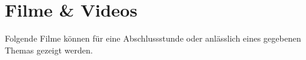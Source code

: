 \geometry{
	a4paper,
	left=25mm,
	right=25mm,
	top=25mm,
	bottom=25mm,
}

\pagestyle{fancy}
\fancyhf{}
\fancyhead[L]{\leftmark}
\fancyhead[R]{\thepage}
\fancyfoot[C]{\today}

\newcommand{\ratingcolor}[1]{%
   \ifcase#1
    \textcolor{gray}{\faTachometer* #1/ 5}%
  \or
    \textcolor{red!80!black}{\faTachometer* #1/ 5}%
  \or
    \textcolor{orange!80!black}{\faTachometer* #1/ 5}%
  \or
    \textcolor{yellow!80!black}{\faTachometer* #1/ 5}%
  \or
    \textcolor{green!60!black}{\faTachometer* #1/ 5}%
  \or
    \textcolor{green!90!black}{\faTachometer* #1/ 5}%
  \else
    #1%
  \fi
}



\newcommand{\mainauthor}{Cyril Blum}
\newcommand{\mainauthormail}{cyril.blum@edu.zh.ch}
\newcommand{\mainauthorA}{Cyril Blum}
\newcommand{\mainauthormailA}{cyril.blum@edu.zh.ch}
\newcommand{\mainauthorB}{Thomas Graf}
\newcommand{\mainauthormailB}{thomas.graf@edu.zh.ch}

\section{Filme \& Videos}
Folgende Filme können für eine Abschlussstunde oder anlässlich eines gegebenen Themas gezeigt werden.

